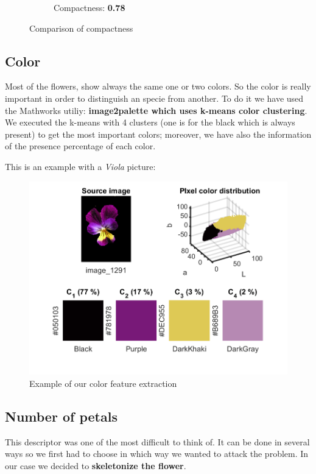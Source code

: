 \documentclass[11]{article}
\begin{document}
\begin{figure}[H]
\begin{subfigure}[t]{.49\linewidth}
    \caption{Compactness: \textbf{0.78}}
    \label{skez}
    \end{subfigure}
    \caption{Comparison of compactness}
\end{figure}


\subsection{Color}
Most of the flowers, show always the same one or two colors. So the color is really important in order to distinguish an specie from another. To do it we have used  the Mathworks utiliy: \textbf{image2palette which uses k-means color clustering}. We executed the k-means with 4 clusters (one is for the black which is always present) to get the most important colors; moreover, we have also the information of the presence percentage of each color.
\medskip

This is an example with a \textit{Viola} picture:
 
 \medskip

\begin{figure}[H]
	\centering
	\includegraphics[scale=0.85]{images/colorOriginal.png}
	\caption{Example of our color feature extraction}
	\label{color}
\end{figure}

\subsection{Number of petals}

This descriptor was one of the most difficult to think of. It can be done in several ways so we first had to choose in which way we wanted to attack the problem. In our case we decided to \textbf{skeletonize the flower}.
\medskip
\end{document}
